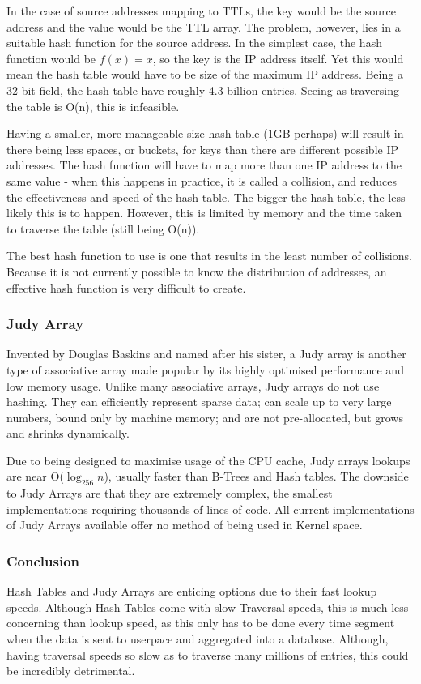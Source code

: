 \documentclass[twocolumn,10pt]{asme2ej}
\begin{document}
In the case of source addresses mapping to TTLs, the key would be the source address and the value would be the TTL array. The problem, however, lies in a suitable hash function for the source address. In the simplest case, the hash function would be $f(x) = x$, so the key is the IP address itself. Yet this would mean the hash table would have to be size of the maximum IP address. Being a 32-bit field, the hash table have roughly 4.3 billion entries. Seeing as traversing the table is O(n), this is infeasible.

Having a smaller, more manageable size hash table (1GB perhaps) will result in there being less spaces, or buckets, for keys than there are different possible IP addresses. The hash function will have to map more than one IP address to the same value - when this happens in practice, it is called a collision, and reduces the effectiveness and speed of the hash table. The bigger the hash table, the less likely this is to happen. However, this is limited by memory and the time taken to traverse the table (still being O(n)).

The best hash function to use is one that results in the least number of collisions. Because it is not currently possible to know the distribution of addresses, an effective hash function is very difficult to create.

\subsubsection{Judy Array\cite{judy}}
Invented by Douglas Baskins and named after his sister, a Judy array is another type of associative array made popular by its highly optimised performance and low memory usage. Unlike many associative arrays, Judy arrays do not use hashing. They can efficiently represent sparse data; can scale up to very large numbers, bound only by machine memory; and are not pre-allocated, but grows and shrinks dynamically.   

Due to being designed to maximise usage of the CPU cache, Judy arrays lookups are near O($\log_{256} n$)\cite{judy256}, usually faster than B-Trees and Hash tables. The downside to Judy Arrays are that they are extremely complex, the smallest implementations requiring thousands of lines of code. All current implementations of Judy Arrays available offer no method of being used in Kernel space. 

\subsubsection{Conclusion}
Hash Tables and Judy Arrays are enticing options due to their fast lookup speeds. Although Hash Tables come with slow Traversal speeds, this is much less concerning than lookup speed, as this only has to be done every time segment when the data is sent to userpace and aggregated into a database. Although, having traversal speeds so slow as to traverse many millions of entries, this could be incredibly detrimental.
\end{document}

